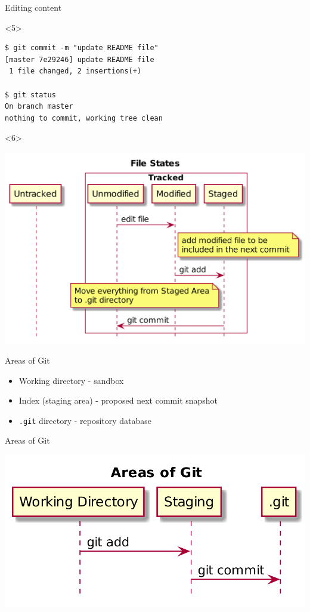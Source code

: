 \documentclass[presentation,aspectratio=169,smaller]{beamer}
\begin{document}
\begin{frame}[label={sec:orgab2a086},fragile]{Editing content}
\begin{onlyenv}<5>
\begin{verbatim}
$ git commit -m "update README file"
[master 7e29246] update README file
 1 file changed, 2 insertions(+)

$ git status
On branch master
nothing to commit, working tree clean
\end{verbatim}
\end{onlyenv}

\begin{onlyenv}<6>
\begin{center}
\includegraphics[width=.9\linewidth]{images/git-edit-2.png}
\end{center}
\end{onlyenv}
\end{frame}

\begin{frame}[label={sec:org24a4900},fragile]{Areas of Git}
 \begin{itemize}
\item Working directory - sandbox
\item Index (staging area) - proposed next commit snapshot
\item \texttt{.git} directory - repository database
\end{itemize}
\end{frame}

\begin{frame}[label={sec:org1ec375a}]{Areas of Git}
\begin{center}
\includegraphics[width=.9\linewidth]{images/areas-of-git.png}
\end{center}
\end{frame}
\end{document}
